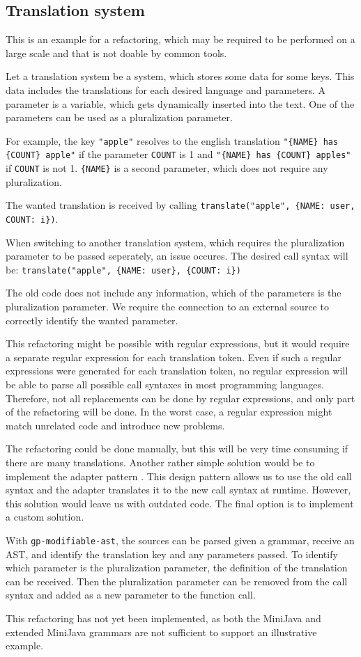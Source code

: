 
\subsection{Translation system}

This is an example for a refactoring, which may be required to be performed on a large scale and that is not doable by common tools.

Let a translation system be a system, which stores some data for some keys. This data includes the translations for each desired language and parameters.
A parameter is a variable, which gets dynamically inserted into the text. One of the parameters can be used as a pluralization parameter.

For example, the key \verb|"apple"| resolves to the english translation \verb|"{NAME} has {COUNT} apple"| if the parameter \lstinline|COUNT| is 1 
and \verb|"{NAME} has {COUNT} apples"| if \lstinline|COUNT| is not 1.
\lstinline|{NAME}| is a second parameter, which does not require any pluralization.

The wanted translation is received by calling \lstinline|translate("apple", {NAME: user, COUNT: i})|.


When switching to another translation system, which requires the pluralization parameter to be passed seperately, an issue occures. 
The desired call syntax will be: \lstinline|translate("apple", {NAME: user}, {COUNT: i})|

The old code does not include any information, which of the parameters is the pluralization parameter. 
We require the connection to an external source to correctly identify the wanted parameter.

This refactoring might be possible with regular expressions, but it would require a separate regular expression for each translation token.
Even if such a regular expressions were generated for each translation token, no regular expression will be able to parse all possible call syntaxes in most programming languages.
Therefore, not all replacements can be done by regular expressions, and only part of the refactoring will be done.
In the worst case, a regular expression might match unrelated code and introduce new problems.

The refactoring could be done manually, but this will be very time consuming if there are many translations.
Another rather simple solution would be to implement the adapter pattern \cite[pages 47-52]{java_design_patterns}. This design pattern allows us to use the old call syntax and the adapter translates it to the new call syntax at runtime.
However, this solution would leave us with outdated code.
The final option is to implement a custom solution.

With \verb|gp-modifiable-ast|, the sources can be parsed given a grammar, receive an AST, and identify the translation key and any parameters passed.
To identify which parameter is the pluralization parameter, the definition of the translation can be received. 
Then the pluralization parameter can be removed from the call syntax and added as a new parameter to the function call.

This refactoring has not yet been implemented, as both the MiniJava and extended MiniJava grammars are not sufficient to support an illustrative example.